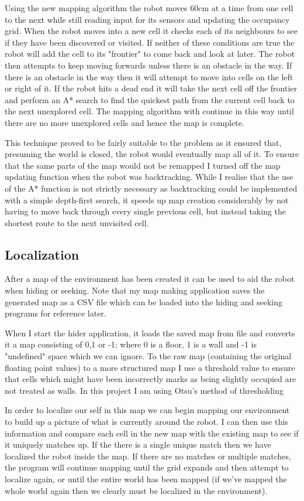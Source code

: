 \documentclass{article}
\begin{document}
Using the new mapping algorithm the robot moves 60cm at a time from one cell to the next while still reading input for its sensors and updating the occupancy grid. When the robot moves into a new cell it checks each of its neighbours to see if they have been discovered or visited. If neither of these conditions are true the robot will add the cell to its "frontier" to come back and look at later. The robot then attempts to keep moving forwards unless there is an obstacle in the way. If there is an obstacle in the way then it will attempt to move into cells on the left or right of it. If the robot hits a dead end it will take the next cell off the frontier and perform an A* search to find the quickest path from the current cell back to the next unexplored cell. The mapping algorithm with continue in this way until there are no more unexplored cells and hence the map is complete.

This technique proved to be fairly suitable to the problem as it ensured that, presuming the world is closed, the robot would eventually map all of it. To ensure that the same parts of the map would not be remapped I turned off the map updating function when the robot was backtracking. While I realise that the use of the A* function is not strictly necessary as backtracking could be implemented with a simple depth-first search, it speeds up map creation considerably by not having to move back through every single previous cell, but instead taking the shortest route to the next unvisited cell.

\subsection{Localization}
After a map of the environment has been created it can be used to aid the robot when hiding or seeking. Note that my map making application saves the generated map as a CSV file which can be loaded into the hiding and seeking programs for reference later.

When I start the hider application, it loads the saved map from file and converts it a map consisting of 0,1 or -1; where 0 is a floor, 1 is a wall and -1 is "undefined" space which we can ignore. To the raw map (containing the original floating point values) to a more structured map I use a threshold value to ensure that cells which might have been incorrectly marks as being slightly occupied are not treated as walls. In this project I am using Otsu's method of thresholding 

In order to localize our self in this map we can begin mapping our environment to build up a picture of what is currently around the robot. I can then use this information and compare each cell in the new map with the existing map to see if it uniquely matches up. If the there is a single unique match then we have localized the robot inside the map. If there are no matches or multiple matches, the program will continue mapping until the grid expands and then attempt to localize again, or until the entire world has been mapped (if we've mapped the whole world again then we clearly must be localized in the environment).
\end{document}
